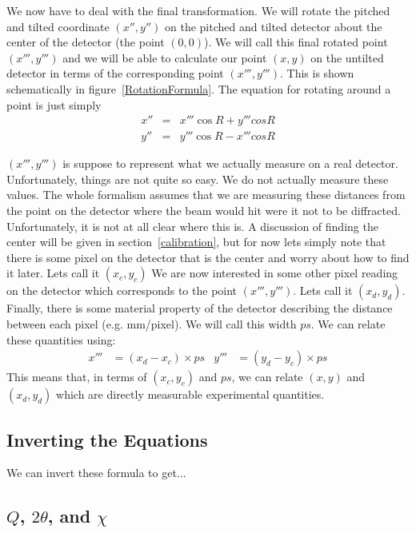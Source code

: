 We now have to deal with the final transformation. We will
rotate the pitched and tilted coordinate $(x'',y'')$ on the
pitched and tilted detector about the center of the
detector (the point $(0,0)$). We will call this final
rotated point $(x''',y''')$ and we will be able to calculate 
our point $(x,y)$ on the untilted detector in terms of the 
corresponding point $(x''',y''')$. This is shown schematically 
in figure~\ref{RotationFormula}. The equation for rotating 
around a point is just simply
\begin{eqnarray}\label{rotation}
    x''&=&x'''\cos R + y'''cos R\\
    y''&=&y'''\cos R - x'''cos R
\end{eqnarray}





$(x''',y''')$ is suppose to represent what we actually
measure on a real detector. Unfortunately, things are
not quite so easy. We do not actually measure these
values. The whole formalism assumes that we are 
measuring these distances from the point on the
detector where the beam would hit were it not to be
diffracted. Unfortunately, it is not at all clear
where this is. A discussion of finding the center will
be given in section~\ref{calibration}, but for now
lets simply note that there is some pixel on the detector
that is the center and worry about how to find it later. 
Lets call it $(x_c,y_c)$ 
We are now interested in some other pixel reading
on the detector which corresponds to the point
$(x''',y''')$. Lets call it $(x_d,y_d)$. Finally,
there is some material property of the detector 
describing the distance between each pixel
(e.g. \unit[1000]{mm/pixel}). We will call
this width $ps$. We can relate these quantities 
using:
\begin{align}\label{conversionToPixels}
    x'''&=(x_d-x_c) \times ps &
    y'''&=(y_d-y_c) \times ps
\end{align}
This means that, in terms of $(x_c,y_c)$ and $ps$,
we can relate $(x,y)$ and $(x_d,y_d)$ which are
directly measurable experimental quantities.



\subsection{Inverting the Equations}

We can invert these formula to get...

\subsection{$Q$, $2\theta$, and $\chi$}

